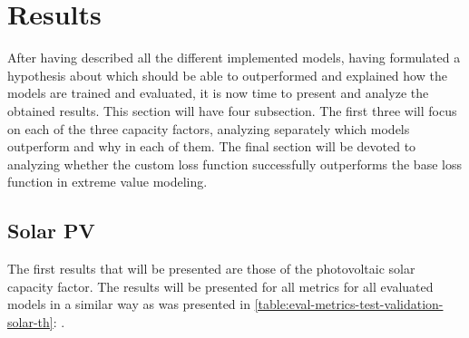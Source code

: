 \section{Results}
After having described all the different implemented models, having formulated a hypothesis about which should be able to outperformed and explained how the models are trained and evaluated, it is now time to present and analyze the obtained results. This section will have four subsection. The first three will focus on each of the three capacity factors, analyzing separately which models outperform and why in each of them. The final section will be devoted to analyzing whether the custom loss function successfully outperforms the base loss function in extreme value modeling. 
\subsection{Solar PV}
\label{s:solar-pv-results}
The first results that will be presented are those of the photovoltaic solar capacity factor. The results will be presented for all metrics for all evaluated models in a similar way as was presented in \autoref{table:eval-metrics-test-validation-solar-th}: .

